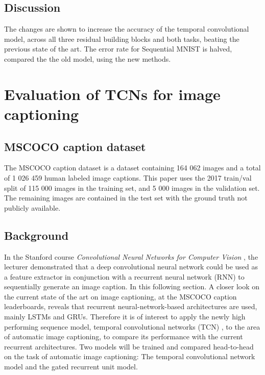 \documentclass[a4paper, twoside]{article}
\begin{document}
\subsection{Discussion}
The changes are shown to increase the accuracy of the temporal convolutional model, across all three residual building blocks and both tasks, beating the previous state of the art.  The error rate for Sequential MNIST is halved, compared the the old model, using the new methods.

\section{Evaluation of TCNs for image captioning}
\subsection{MSCOCO caption dataset}
The MSCOCO caption dataset \cite{mscoco} is a dataset containing 164 062 images and a total of 1 026 459 human labeled image captions. This paper uses the 2017 train/val split of 115 000 images in the training set, and 5 000 images in the validation set. The remaining images are contained in the test set with the ground truth not publicly available.

\subsection{Background}
In the Stanford course \textit{Convolutional Neural Networks for Computer Vision} \cite{cs231n}, the lecturer demonstrated that a deep convolutional neural network could be used as a feature extractor in conjunction with a recurrent neural network (RNN) to sequentially generate an image caption. In this following section. A closer look on the current state of the art on image captioning, at the MSCOCO caption leaderboards, reveals that recurrent neural-network-based architectures are used, mainly LSTMs and GRUs. Therefore it is of interest to apply the newly high performing sequence model, temporal convolutional networks (TCN) \cite{tcn}, to the area of automatic image captioning, to compare its performance with the current recurrent architectures. Two models will be trained and compared head-to-head on the task of automatic image captioning: The temporal convolutional network model and the gated recurrent unit model.
\end{document}
